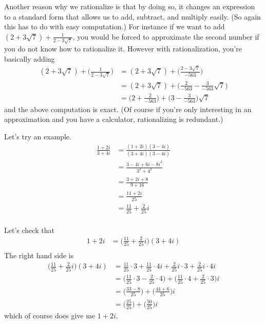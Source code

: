 Another reason why we rationalize is that by doing so,
it changes an expression 
to a standard form that allows us to add, subtract,
and multiply easily. (So again this has to do with easy computation.)
For instance if we want to add $(2 + 3\sqrt{7}) + \frac{1}{2 - 3 \sqrt{7}}$,
you would be forced to approximate the second number if you do not know
how to rationalize it. However with rationalization, you're basically
adding
\begin{align*}
(2 + 3\sqrt{7}) + \biggl( \frac{1}{2 - 3 \sqrt{7}} \biggr)
&=
(2 + 3\sqrt{7}) + \biggl( \frac{2 - 3\sqrt{7}}{-563} \biggr) \\
&=
(2 + 3\sqrt{7}) + \biggl( \frac{2}{-563} - \frac{3}{-563}\sqrt{7} \biggr) \\
&=
\biggl( 2 + \frac{2}{-563} \biggr)
+ \biggl( 3 - \frac{3}{-563} \biggr) \sqrt{7}
\end{align*}
and the above computation is exact.
(Of course if you're only interesting in an approximation
and you have a calculator, rationalizing is redundant.)



Let's try an example. 
\begin{align*}
\frac{1 + 2i}{3 + 4i}
&= \frac{(1 + 2i)(3 - 4i)}{(3 + 4i)(3 - 4i)} \\
&= \frac{3 - 4i + 6i -8i^2}{3^2 + 4^2} \\
&= \frac{3 +2i + 8}{9 + 16} \\
&= \frac{11 + 2i}{25} \\
&= \frac{11}{25} + \frac{2}{25}i \\
\end{align*}

Let's check that 
\begin{align*}
1 + 2i
&= \biggl( \frac{11}{25} + \frac{2}{25}i \biggr) (3 + 4i)\\
\end{align*}
The right hand side is
\begin{align*}
\biggl( \frac{11}{25} + \frac{2}{25}i \biggr) (3 + 4i)
&= \frac{11}{25} \cdot 3 + \frac{11}{25} \cdot 4i + \frac{2}{25}i \cdot 3 + \frac{2}{25}i \cdot 4i \\
&= \biggl( \frac{11}{25} \cdot 3 -  \frac{2}{25} \cdot 4 \biggr) + \biggl( \frac{11}{25} \cdot 4 + \frac{2}{25} \cdot 3 \biggr)i \\ 
&= \biggl( \frac{33 - 8}{25} \biggr) + \biggl( \frac{44 + 6}{25} \biggr)i \\
&= \biggl( \frac{25}{25} \biggr) + \biggl( \frac{50}{25} \biggr)i 
\end{align*}
which of course does give me $1 + 2i$.

